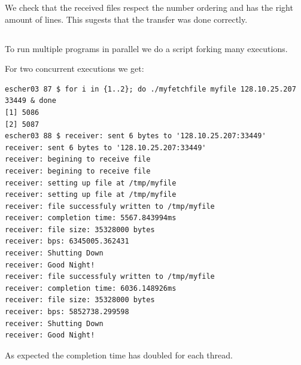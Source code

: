 \documentclass[paper=a4, fontsize=11pt]{scrartcl}
\numberwithin{equation}{section}		%
\numberwithin{figure}{section}			%
\numberwithin{table}{section}				%
\begin{document}
We check that the received files respect the number ordering
and has the right amount of lines. This sugests that the transfer
was done correctly.

\subsection{}
To run multiple programs in parallel we do a script forking
many executions.

For two concurrent executions we get:
\begin{verbatim}
escher03 87 $ for i in {1..2}; do ./myfetchfile myfile 128.10.25.207 33449 & done
[1] 5086
[2] 5087
escher03 88 $ receiver: sent 6 bytes to '128.10.25.207:33449'
receiver: sent 6 bytes to '128.10.25.207:33449'
receiver: begining to receive file
receiver: begining to receive file
receiver: setting up file at /tmp/myfile
receiver: setting up file at /tmp/myfile
receiver: file successfuly written to /tmp/myfile
receiver: completion time: 5567.843994ms
receiver: file size: 35328000 bytes
receiver: bps: 6345005.362431
receiver: Shutting Down
receiver: Good Night!
receiver: file successfuly written to /tmp/myfile
receiver: completion time: 6036.148926ms
receiver: file size: 35328000 bytes
receiver: bps: 5852738.299598
receiver: Shutting Down
receiver: Good Night!
\end{verbatim}

As expected the completion time has doubled for each thread.
\end{document}
